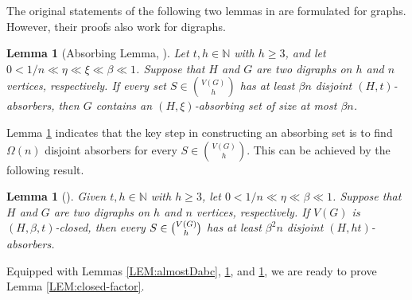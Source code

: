 \documentclass[11pt,a4paper,reqno]{amsart}
\newtheorem{lemma}[theorem]{Lemma}
\theoremstyle{definition} %
\begin{document}
The original statements of the following two lemmas in \cite{hanRSA64,nenadovSJDM34} are formulated for graphs. However, their proofs also work for digraphs.

\begin{lemma}[Absorbing Lemma, \cite{nenadovSJDM34}]\label{LEM:Absorb}
Let $t,h \in \mathbb{N}$ with $h \geqslant 3$, and let $0<1/n\ll \eta \ll  \xi\ll \beta \ll 1$. Suppose that $H$ and $G$ are two digraphs on $h$ and $n$ vertices, respectively. If every set $S\in \binom{V(G)}{h}$ has at least $\beta n$ disjoint $(H,t)$-absorbers, then $G$ contains an $(H,\xi)$-absorbing set of size at most $\beta n$.
\end{lemma}

Lemma \ref{LEM:Absorb} indicates that the key step in constructing an absorbing set is to find $\Omega(n)$ disjoint absorbers for every $S\in \binom{V(G)}{h}$. This can be achieved by the following result.

\begin{lemma}[\cite{hanRSA64}]\label{LEM-findvtxab}
Given $t,h\in \mathbb{N}$ with $h\geqslant 3$, let $0<1/n \ll \eta \ll \beta \ll 1$. Suppose that $H$ and $G$ are two digraphs on $h$ and $n$ vertices, respectively. If $V(G)$ is $(H,\beta,t)$-closed, then every $S\in \tbinom{V(G)}{h}$ has at least $\beta^2 n$ disjoint $(H,ht)$-absorbers.
\end{lemma}

Equipped with Lemmas \ref{LEM:almostDabc}, \ref{LEM:Absorb}, and \ref{LEM-findvtxab}, we are ready to prove Lemma \ref{LEM:closed-factor}.
\end{document}
